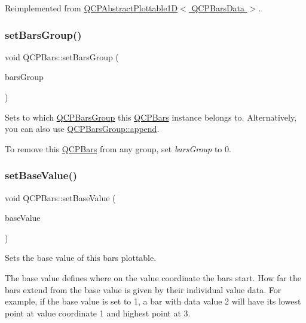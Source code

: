Reimplemented from \hyperlink{class_q_c_p_abstract_plottable1_d_ac385c38a79e419ed3600c2ee398fd216}{Q\+C\+P\+Abstract\+Plottable1\+D$<$ Q\+C\+P\+Bars\+Data $>$}.

\mbox{\label{class_q_c_p_bars_aedd1709061f0b307c47ddb45e172ef9a}} 
\subsubsection{\texorpdfstring{set\+Bars\+Group()}{setBarsGroup()}}
{\footnotesize\ttfamily void Q\+C\+P\+Bars\+::set\+Bars\+Group (\begin{DoxyParamCaption}\item[{\hyperlink{class_q_c_p_bars_group}{Q\+C\+P\+Bars\+Group} $\ast$}]{bars\+Group }\end{DoxyParamCaption})}

Sets to which \hyperlink{class_q_c_p_bars_group}{Q\+C\+P\+Bars\+Group} this \hyperlink{class_q_c_p_bars}{Q\+C\+P\+Bars} instance belongs to. Alternatively, you can also use \hyperlink{class_q_c_p_bars_group_a809ed63cc4ff7cd5b0b8c96b470163d3}{Q\+C\+P\+Bars\+Group\+::append}.

To remove this \hyperlink{class_q_c_p_bars}{Q\+C\+P\+Bars} from any group, set {\itshape bars\+Group} to 0. \mbox{\label{class_q_c_p_bars_a574ec7eb7537566df1a28ff085d75623}} 
\subsubsection{\texorpdfstring{set\+Base\+Value()}{setBaseValue()}}
{\footnotesize\ttfamily void Q\+C\+P\+Bars\+::set\+Base\+Value (\begin{DoxyParamCaption}\item[{double}]{base\+Value }\end{DoxyParamCaption})}

Sets the base value of this bars plottable.

The base value defines where on the value coordinate the bars start. How far the bars extend from the base value is given by their individual value data. For example, if the base value is set to 1, a bar with data value 2 will have its lowest point at value coordinate 1 and highest point at 3.

